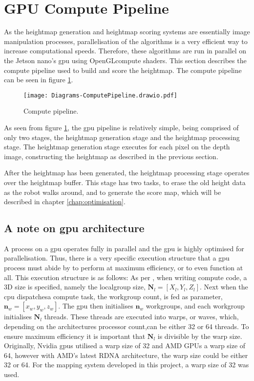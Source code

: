     \section{GPU Compute Pipeline}
        As the heightmap generation and heightmap scoring systems are essentially image manipulation processes, parallelisation of the algorithms is a very efficient way to increase computational speeds. Therefore, these algorithms are run in parallel on the Jetson nano's \ac{gpu} using OpenGLcompute shaders. This section describes the compute pipeline used to build and score the heightmap. The compute pipeline can be seen in figure \ref{fig:compute_pipe}.
        \begin{figure}[h]
            \centering
            \texttt{[image: Diagrams-ComputePipeline.drawio.pdf]}
            \caption{Compute pipeline.}
            \label{fig:compute_pipe}
        \end{figure}
    
        \noindent
        As seen from figure \ref{fig:compute_pipe}, the \ac{gpu} pipeline is relatively simple, being comprised of only two stages, the heightmap generation stage and the heightmap processing stage. The heightmap generation stage executes for each pixel on the depth image, constructing the heightmap as described in the previous section.
        
        After the heightmap has been generated, the heightmap processing stage operates over the heightmap buffer. This stage has two tasks, to erase the old height data as the robot walks around, and to generate the score map, which will be described in chapter \ref{chap:optimisation}.
        
        \subsection{A note on \ac{gpu} architecture}
            A process on a \ac{gpu} operates fully in parallel and the \ac{gpu} is highly optimised for parallelisation. Thus, there is a very specific execution structure that a \ac{gpu} process must abide by to perform at maximum efficiency, or to even function at all. This execution structure is as follows: As per \cite{nvidia_doc}, when writing compute code, a 3D size is specified, namely the localgroup size, \(\bm{N}_{l} = [X_l,Y_{l},Z_{l}]\). Next when the \ac{cpu} dispatchesa compute task, the workgroup count, is fed as parameter, \(\bm{n}_{w} = [x_{w},y_{w},z_{w}]\). The \ac{gpu} then initialises \(\bm{n}_w\) workgroups, and each workgroup initialises \(\bm{N}_l\) threads. These threads are executed into warps, or waves, which, depending on the architectures processor count,can be either 32 or 64 threads. To ensure maximum efficiency it is important that \(\bm{N}_l\) is divisible by the warp size.
            Originally, Nvidia \ac{gpu}s utilised a warp size of 32 and AMD GPUs a warp size of 64, however with AMD's latest RDNA architecture, the warp size could be either 32 or 64. For the mapping system developed in this project, a warp size of 32 was used.
            
